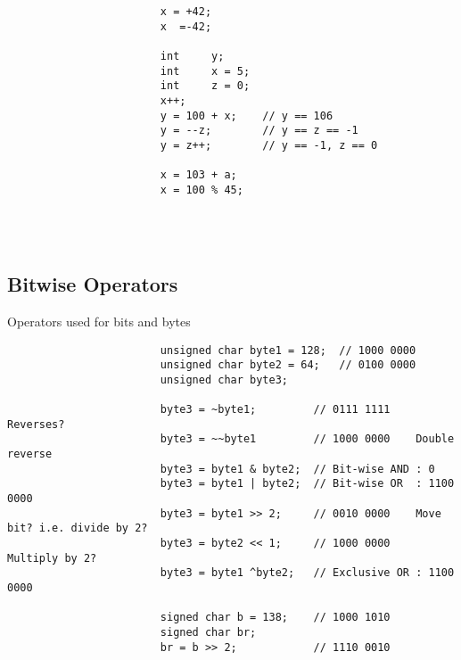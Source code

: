 \documentclass{report}
\begin{document}
				\begin{minipage}{\linewidth}
					\begin{lstlisting}
						x = +42;
						x  =-42;
						
						int		y;
						int		x = 5;
						int		z = 0;
						x++;
						y = 100 + x;	// y == 106
						y = --z;		// y == z == -1
						y = z++;		// y == -1, z == 0
						
						x = 103 + a;
						x = 100 % 45;
					\end{lstlisting}
				\end{minipage}
				\\ \\
			
			\subsection{Bitwise Operators}
				Operators used for bits and bytes \\
				\begin{minipage}{\linewidth}
					\begin{lstlisting}
						unsigned char byte1 = 128;	// 1000 0000
						unsigned char byte2 = 64;	// 0100 0000
						unsigned char byte3;
						
						byte3 = ~byte1;			// 0111 1111	Reverses?
						byte3 = ~~byte1			// 1000 0000	Double reverse
						byte3 = byte1 & byte2;	// Bit-wise AND : 0
						byte3 = byte1 | byte2;	// Bit-wise OR 	: 1100 0000
						byte3 = byte1 >> 2;		// 0010 0000	Move bit? i.e. divide by 2?
						byte3 = byte2 << 1;		// 1000 0000	Multiply by 2? 
						byte3 = byte1 ^byte2;	// Exclusive OR : 1100 0000
						
						signed char b = 138;	// 1000 1010
						signed char br;
						br = b >> 2;			// 1110 0010
					\end{lstlisting}
				\end{minipage}
				\\ \\
				
			
\end{document}
